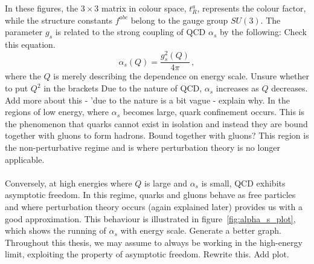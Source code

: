 In these figures, the $3\times3$ matrix in colour space, $t_R^a$, represents the colour factor, while the structure constants $f^{abc}$  belong to the gauge group $SU(3)$. The parameter $g_s$ is related to the strong coupling of QCD $\alpha_s$ by the following: {\color{blue}Check this equation.} 
\begin{equation}
	\alpha_s(Q)=\frac{g_s^2(Q)}{4\pi}\,,
	\label{eq:coupling-constant}
\end{equation}
where the $Q$ is merely describing the dependence on energy scale. 
{\color{blue}Unsure whether to put $Q^2$ in the brackets}
Due to the nature of QCD, $\alpha_s$ increases as  $Q$ decreases. {\color{blue} Add more about this - 'due to the nature is a bit vague - explain why.} In the regions of low energy, where $\alpha_s$ becomes large, quark confinement occurs. This is the phenomenon that quarks cannot exist in isolation and instead they are bound together with gluons to form hadrons.  {\color{blue} Bound together with gluons?} This region is the non-perturbative regime and is where perturbation theory is no longer applicable. \\ \\
Conversely, at high energies where $Q$ is large and $\alpha_s$ is small, QCD exhibits asymptotic freedom. In this regime, quarks and gluons behave as free particles and where perturbation theory occurs (again explained later) provides us with a good approximation. This behaviour is illustrated in figure~\ref{fig:alpha_s_plot}, which shows the running of $\alpha_s$ with energy scale.  {\color{blue}Generate a better graph.} Throughout this thesis, we may assume to always be working in the high-energy limit, exploiting the property of asymptotic freedom.
{\color{blue}Rewrite this.} 
{\color{green}Add plot.}

